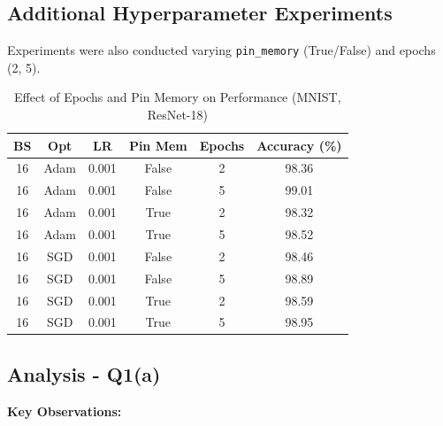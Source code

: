 \documentclass[11pt,a4paper]{article}
\begin{document}
\subsection{Additional Hyperparameter Experiments}

Experiments were also conducted varying \texttt{pin\_memory} (True/False) and epochs (2, 5).

\begin{table}[H]
\centering
\caption{Effect of Epochs and Pin Memory on Performance (MNIST, ResNet-18)}
\small
\begin{tabular}{|c|c|c|c|c|c|}
\hline
\textbf{BS} & \textbf{Opt} & \textbf{LR} & \textbf{Pin Mem} & \textbf{Epochs} & \textbf{Accuracy (\%)} \\
\hline
16 & Adam & 0.001 & False & 2 & 98.36 \\
\hline
16 & Adam & 0.001 & False & 5 & 99.01 \\
\hline
16 & Adam & 0.001 & True & 2 & 98.32 \\
\hline
16 & Adam & 0.001 & True & 5 & 98.52 \\
\hline
16 & SGD & 0.001 & False & 2 & 98.46 \\
\hline
16 & SGD & 0.001 & False & 5 & 98.89 \\
\hline
16 & SGD & 0.001 & True & 2 & 98.59 \\
\hline
16 & SGD & 0.001 & True & 5 & 98.95 \\
\hline
\end{tabular}
\end{table}

\subsection{Analysis - Q1(a)}

\textbf{Key Observations:}
\end{document}
